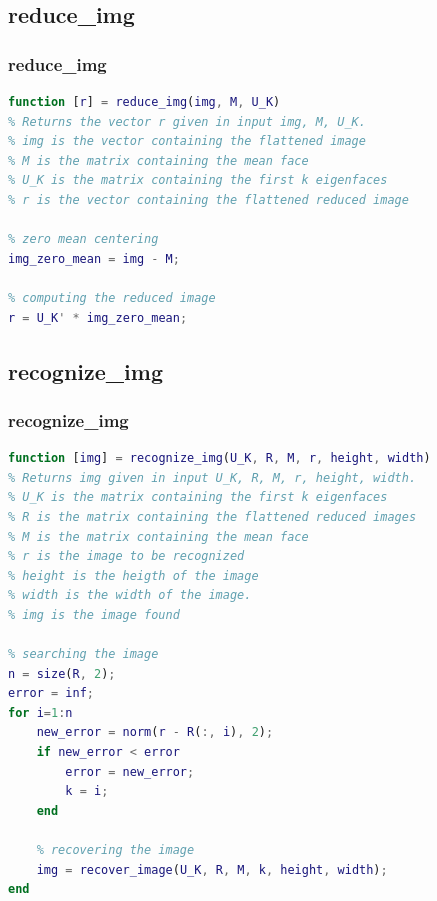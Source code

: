 \documentclass[10pt]{beamer}
\begin{document}
    \subsection{reduce\_img}
    \begin{frame}[fragile]
        \frametitle{reduce\_img}

        \begin{lstlisting}[language=Matlab, numbers=none]
function [r] = reduce_img(img, M, U_K)
% Returns the vector r given in input img, M, U_K.
% img is the vector containing the flattened image
% M is the matrix containing the mean face
% U_K is the matrix containing the first k eigenfaces
% r is the vector containing the flattened reduced image

% zero mean centering
img_zero_mean = img - M;

% computing the reduced image
r = U_K' * img_zero_mean;

        \end{lstlisting}
        
    \end{frame}

    \subsection{recognize\_img}
    \begin{frame}[fragile]
        \frametitle{recognize\_img}

        \begin{lstlisting}[language=Matlab, numbers=none]
function [img] = recognize_img(U_K, R, M, r, height, width)
% Returns img given in input U_K, R, M, r, height, width.
% U_K is the matrix containing the first k eigenfaces
% R is the matrix containing the flattened reduced images
% M is the matrix containing the mean face
% r is the image to be recognized
% height is the heigth of the image
% width is the width of the image.
% img is the image found

% searching the image
n = size(R, 2);
error = inf;
for i=1:n
    new_error = norm(r - R(:, i), 2);
    if new_error < error
        error = new_error;
        k = i;
    end 

    % recovering the image
    img = recover_image(U_K, R, M, k, height, width);
end
        \end{lstlisting}
        
    \end{frame}
\end{document}
